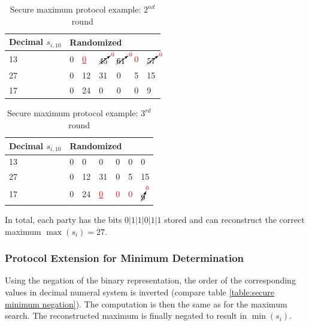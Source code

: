 \begin{table}[!htb]
	\centering
	\caption{Secure maximum protocol example: $2^{nd}$ round} \label{table:secure maximum p1 not maximum}
	\begin{tabular}{|l|l|l|l|l|l|l|}
		\hline
		Decimal $s_{i,10}$ & \multicolumn{6}{l|}{Randomized} \\ \hline
		13                 & 0    & \textcolor{red}{\underline{0}}    & $\cancelto{\textcolor{red}{0}}{45}$    & $\cancelto{\textcolor{red}{0}}{61}$    & \textcolor{red}{0}   & $\cancelto{\textcolor{red}{0}}{57}$   \\ \hline
		27                 & 0    & 12    & 31    & 0    & 5   & 15   \\ \hline
		17                 & 0    & 24    & 0    & 0    & 0   & 9   \\ \hline
	\end{tabular}
\end{table}

\begin{table}[!htb]
	\centering
	\caption{Secure maximum protocol example: $3^{rd}$ round} \label{table:secure maximum p3 not maximum}
	\begin{tabular}{|l|l|l|l|l|l|l|}
		\hline
		Decimal $s_{i,10}$ & \multicolumn{6}{l|}{Randomized} \\ \hline
		13                 & 0    & 0    & 0    & 0    & 0   & 0   \\ \hline
		27                 & 0    & 12    & 31    & 0    & 5   & 15   \\ \hline
		17                 & 0    & 24    & \textcolor{red}{\underline{0}}    & \textcolor{red}{0}    & \textcolor{red}{0}   & $\cancelto{\textcolor{red}{0}}{9}$   \\ \hline
	\end{tabular}
\end{table}

In total, each party has the bits $0|1|1|0|1|1$ stored and can reconstruct the correct maximum $\max(s_i)=27$.

\subsubsection{Protocol Extension for Minimum Determination} \label{Protocol Extension for Minimum Determination}

Using the negation of the binary representation, the order of the corresponding values in decimal numeral system is inverted (compare table \ref{table:secure minimum negation}). The computation is then the same as for the maximum search. The reconstructed maximum is finally negated to result in $\min(s_i)$.

